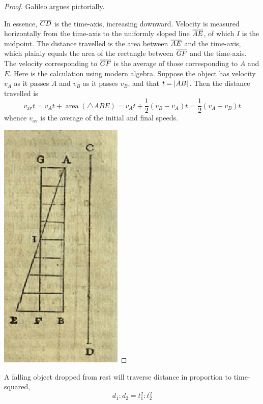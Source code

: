 \begin{proof}
	Galileo argues pictorially.\par
	\begin{minipage}[t]{0.8\linewidth}\vspace{-5pt}
		In essence, $\overline{CD}$ is the time-axis, increasing downward. Velocity is measured horizontally from the time-axis to the uniformly sloped line $\overline{AE}$, of which $I$ is the midpoint.\smallbreak
		The distance travelled is the area between $\overline{AE}$ and the time-axis, which plainly equals the area of the rectangle between $\overline{GF}$ and the time-axis. The velocity corresponding to $\overline{GF}$ is the average of those corresponding to $A$ and $E$.\smallbreak
		Here is the calculation using modern algebra. Suppose the object has velocity $v_A$ as it passes $A$ and $v_B$ as it passes $v_B$, and that $t=\left| AB\right|$. Then the distance travelled is
		\[
			v_{\text{av}}t =v_At+\operatorname{area}(\triangle ABE) =v_At+\frac 12(v_B-v_A)t=\frac 12(v_A+v_B)t
		\]
		whence $v_{\text{av}}$ is the average of the initial and final speeds.
	\end{minipage}
	\hfill
	\begin{minipage}[t]{0.18\linewidth}\vspace{-20pt}
		\flushright\includegraphics[scale=0.45]{galileo-accel}
	\end{minipage}
\end{proof}

\begin{cor*}{}{}
	A falling object dropped from rest will traverse distance in proportion to time-squared,
	\[
		d_1:d_2=t_1^2:t_2^2
	\]
\end{cor*}

